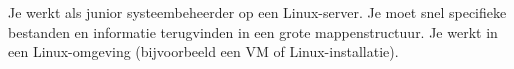 Je werkt als junior systeembeheerder op een Linux-server. Je moet snel specifieke bestanden en informatie terugvinden in een grote mappenstructuur. Je werkt in een Linux-omgeving (bijvoorbeeld een VM of Linux-installatie).

